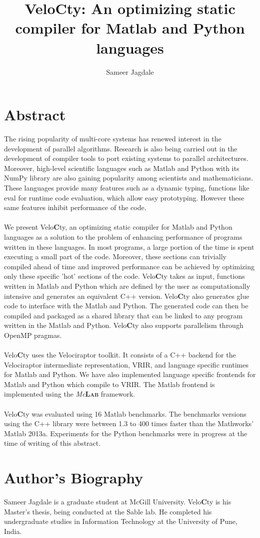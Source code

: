 \documentclass[a4paper, 12pt]{article}
\newcommand{\matlab}{{\textsc Matlab}\xspace}
\newcommand{\velocty}{{Velo\textbf{C}ty}\xspace}
\newcommand{\smclab}{\textrm{\textsl{Mc}\textbf{\textsc{Lab}}}}
\newcommand{\mclab}{\smclab\xspace}
\begin{document}
\title{\velocty : An optimizing static compiler for \matlab and Python languages}
\author[1]{Sameer Jagdale}
\maketitle
\section*{Abstract}
The rising popularity of multi-core systems has renewed interest in the development of parallel algorithms. Research is also being carried out in the development of compiler tools to port existing systems to parallel architectures. Moreover, high-level scientific languages such as \matlab and Python with its NumPy library are also gaining popularity among scientists and mathematicians. These languages provide many features such as a dynamic typing, functions like eval for runtime code evaluation, which allow easy prototyping. However these same features inhibit performance of the code. \\ \\
We present \velocty, an optimizing static compiler for \matlab and Python languages as a solution to the problem of enhancing performance of programs written in these languages. In most programs, a large portion of the time is spent executing a small part of the code. Moreover, these sections can trivially compiled ahead of time and improved performance can be achieved by optimizing only these specific 'hot' sections of the code. \velocty takes as input, functions written in \matlab and Python which are defined by the user as computationally intensive and generates an equivalent C++ version. \velocty also generates glue code to interface with the \matlab and Python. The generated code can then be compiled and packaged as a shared library that can be linked to any program written in the \matlab and Python. \velocty also supports parallelism through OpenMP pragmas.\\ \\
\velocty uses the Velociraptor toolkit. It consists of a C++ backend for the Velociraptor intermediate representation, VRIR, and language specific runtimes for \matlab and Python. We have also implemented language specific frontends for \matlab and Python which compile to VRIR. The \matlab frontend is implemented using the \mclab framework. \\ \\
\velocty was evaluated using 16 \matlab benchmarks. The benchmarks versions using the C++ library were between 1.3 to 400 times faster than the Mathworks' \matlab2013a. Experiments for the Python benchmarks were in progress at the time of writing of this abstract.
\section*{Author's Biography}
Sameer Jagdale is a graduate student at McGill University. \velocty is his Master's thesis, being conducted at the Sable lab. He completed his undergraduate studies in Information Technology at the University of Pune, India.
\end{document}
